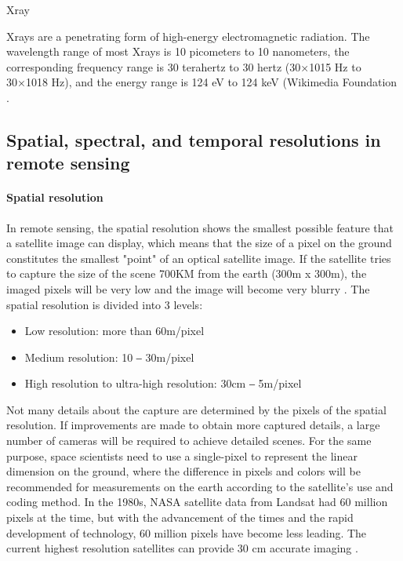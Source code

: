\documentclass[conference]{IEEEtran}
\newcommand{\subparagraph}{}
\begin{document}
\subparagraph{X\-ray}
    
X\-rays are a penetrating form of high-energy electromagnetic radiation. The wavelength range of most X\-rays is 10 picometers 
to 10 nanometers, the corresponding frequency range is 30 terahertz to 30 hertz (30×1015 Hz to 30×1018 Hz), and the energy range 
is 124 eV to 124 keV (Wikimedia Foundation \cite{XrayWiki61:online}.

\subsection{Spatial, spectral, and temporal resolutions in remote sensing}
    
\paragraph{Spatial resolution} 
    
In remote sensing, the spatial resolution shows the smallest possible feature that a satellite image can display, which means 
that the size of a pixel on the ground constitutes the smallest "point" of an optical satellite image. If the satellite tries 
to capture the size of the scene 700KM from the earth (300m x 300m), the imaged pixels will be very low and the image will become 
very blurry \cite{AtlasAIW26:online}. The spatial resolution is divided into 3 levels:
    
    \begin{itemize}
        \item Low resolution: more than 60m/pixel 
        \item Medium resolution: 10 ‒ 30m/pixel 
        \item High resolution to ultra-high resolution: 30cm ‒ 5m/pixel
    \end{itemize}
    
Not many details about the capture are determined by the pixels of the spatial resolution. If improvements are made to obtain 
more captured details, a large number of cameras will be required to achieve detailed scenes. For the same purpose, space scientists 
need to use a single-pixel to represent the linear dimension on the ground, where the difference in pixels and colors will be 
recommended for measurements on the earth according to the satellite's use and coding method. In the 1980s, NASA satellite data from 
Landsat had 60 million pixels at the time, but with the advancement of the times and the rapid development of technology, 60 million 
pixels have become less leading. The current highest resolution satellites can provide 30 cm accurate imaging \cite{Satellit48:online}. 
\end{document}

